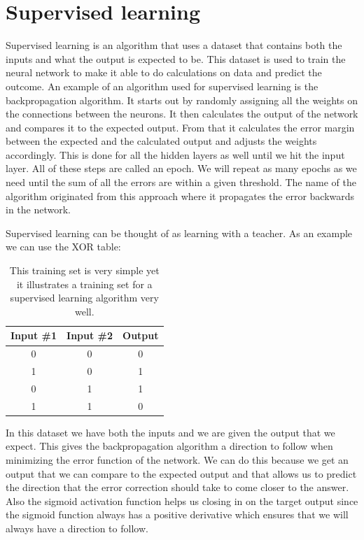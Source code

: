 \section{Supervised learning}
Supervised learning is an algorithm that uses a dataset that contains both the inputs and what the output is expected to be. This dataset is used to train the neural network to make it able to do calculations on data and predict the outcome. An example of an algorithm used for supervised learning is the backpropagation algorithm. 
It starts out by randomly assigning all the weights on the connections between the neurons. It then calculates the output of the network and compares it to the expected output. From that it calculates the error margin between the expected and the calculated output and adjusts the weights accordingly. This is done for all the hidden layers as well until we hit the input layer. All of these steps are called an epoch. We will repeat as many epochs as we need until the sum of all the errors are within a given threshold. The name of the algorithm originated from this approach where it propagates the error backwards in the network.

Supervised learning can be thought of as learning with a teacher. As an example we can use the XOR table:

\begin{table}[h!]
\centering  %
\begin{tabular}{c c c} %
Input \#1 & Input \#2 & Output \\ [0.5ex] %
\hline                  %
0 & 0 & 0  \\ %
1 & 0 & 1  \\
0 & 1 & 1  \\
1 & 1 & 0 \\ [1ex] %
\hline %
\end{tabular}
\caption{This training set is very simple yet it illustrates a training set for a supervised learning algorithm very well.} %
\label{table:nonlin} %
\end{table}

In this dataset we have both the inputs and we are given the output that we expect. This gives the backpropagation algorithm a direction to follow when minimizing the error function of the network. We can do this because we get an output that we can compare to the expected output and that allows us to predict the direction that the error correction should take to come closer to the answer. Also the sigmoid activation function helps us closing in on the target output since the sigmoid function always has a positive derivative which ensures that we will always have a direction to follow\cite[p. 153]{rojas1996neural}.

